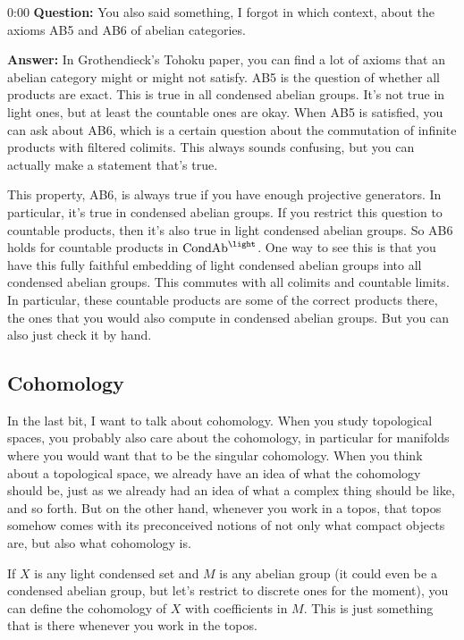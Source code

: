 \begin{unfinished}{0:00}
\textbf{Question:} You also said something, I forgot in which context, about the axioms AB5 and AB6 of abelian categories.

\textbf{Answer:} In Grothendieck's Tohoku paper, you can find a lot of axioms that an abelian category might or might not satisfy. AB5 is the question of whether all products are exact. This is true in all condensed abelian groups. It's not true in light ones, but at least the countable ones are okay. When AB5 is satisfied, you can ask about AB6, which is a certain question about the commutation of infinite products with filtered colimits. This always sounds confusing, but you can actually make a statement that's true.

This property, AB6, is always true if you have enough projective generators. In particular, it's true in condensed abelian groups. If you restrict this question to countable products, then it's also true in light condensed abelian groups. 
So AB6 holds for countable products in $\Cond\Ab^\light$. One way to see this is that you have this fully faithful embedding of light condensed abelian groups into all condensed abelian groups. This commutes with all colimits and countable limits. In particular, these countable products are some of the correct products there, the ones that you would also compute in condensed abelian groups. But you can also just check it by hand.

\subsection{Cohomology}
In the last bit, I want to talk about cohomology. When you study topological spaces, you probably also care about the cohomology, in particular for manifolds where you would want that to be the singular cohomology. When you think about a topological space, we already have an idea of what the cohomology should be, just as we already had an idea of what a complex thing should be like, and so forth. 
But on the other hand, whenever you work in a topos, that topos somehow comes with its preconceived notions of not only what compact objects are, but also what cohomology is.

If $X$ is any light condensed set and $M$ is any abelian group (it could even be a condensed abelian group, but let's restrict to discrete ones for the moment), you can define the cohomology of $X$ with coefficients in $M$. This is just something that is there whenever you work in the topos.


\end{unfinished}
